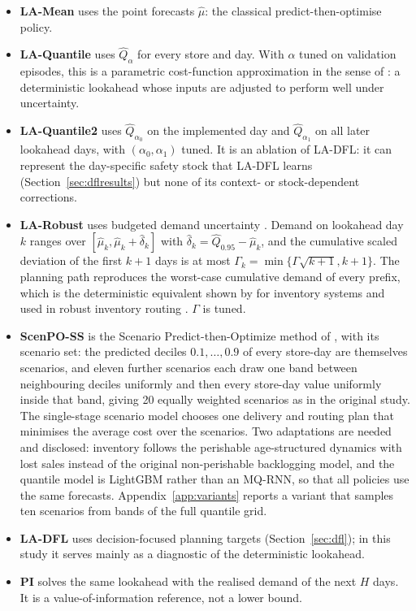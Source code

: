 \begin{itemize}[leftmargin=*]
\item \textbf{LA-Mean} uses the point forecasts $\hat\mu$: the classical predict-then-optimise policy.
\item \textbf{LA-Quantile} uses $\hat Q_\alpha$ for every store and day. With $\alpha$ tuned on validation episodes, this is a parametric cost-function approximation in the sense of \citet{powell2019unified}: a deterministic lookahead whose inputs are adjusted to perform well under uncertainty.
\item \textbf{LA-Quantile2} uses $\hat Q_{\alpha_0}$ on the implemented day and $\hat Q_{\alpha_1}$ on all later lookahead days, with $(\alpha_0,\alpha_1)$ tuned. It is an ablation of LA-DFL: it can represent the day-specific safety stock that LA-DFL learns (Section~\ref{sec:dflresults}) but none of its context- or stock-dependent corrections.
\item \textbf{LA-Robust} uses budgeted demand uncertainty \citep{bertsimas2006robust}. Demand on lookahead day $k$ ranges over $[\hat\mu_k,\hat\mu_k+\hat\delta_k]$ with $\hat\delta_k=\hat Q_{0.95}-\hat\mu_k$, and the cumulative scaled deviation of the first $k+1$ days is at most $\Gamma_k=\min\{\Gamma\sqrt{k+1},k+1\}$. The planning path reproduces the worst-case cumulative demand of every prefix, which is the deterministic equivalent shown by \citet{bertsimas2006robust} for inventory systems and used in robust inventory routing \citep{solyali2012robust}. $\Gamma$ is tuned.
\item \textbf{ScenPO-SS} is the Scenario Predict-then-Optimize method of \citet{jia2025scenario}, with its scenario set: the predicted deciles $0.1,\dots,0.9$ of every store-day are themselves scenarios, and eleven further scenarios each draw one band between neighbouring deciles uniformly and then every store-day value uniformly inside that band, giving 20 equally weighted scenarios as in the original study. The single-stage scenario model chooses one delivery and routing plan that minimises the average cost over the scenarios. Two adaptations are needed and disclosed: inventory follows the perishable age-structured dynamics with lost sales instead of the original non-perishable backlogging model, and the quantile model is LightGBM rather than an MQ-RNN, so that all policies use the same forecasts. Appendix~\ref{app:variants} reports a variant that samples ten scenarios from bands of the full quantile grid.
\item \textbf{LA-DFL} uses decision-focused planning targets (Section~\ref{sec:dfl}); in this study it serves mainly as a diagnostic of the deterministic lookahead.
\item \textbf{PI} solves the same lookahead with the realised demand of the next $H$ days. It is a value-of-information reference, not a lower bound.
\end{itemize}

